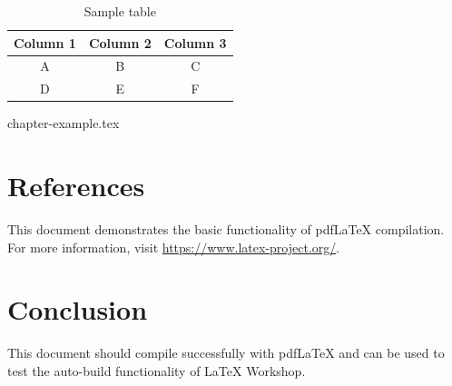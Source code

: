 \documentclass[a4paper,12pt]{article}
\begin{document}
\begin{table}[h]
    \centering
    \begin{tabular}{|c|c|c|}
        \hline
        Column 1 & Column 2 & Column 3 \\
        \hline
        A        & B        & C        \\
        D        & E        & F        \\
        \hline
    \end{tabular}
    \caption{Sample table}
    \label{tab:sample}
\end{table}

{chapter-example.tex}

\section{References}

This document demonstrates the basic functionality of pdfLaTeX compilation. For more information, visit \url{https://www.latex-project.org/}.




\section{Conclusion}

This document should compile successfully with pdfLaTeX and can be used to test the auto-build functionality of LaTeX Workshop.
\end{document}
